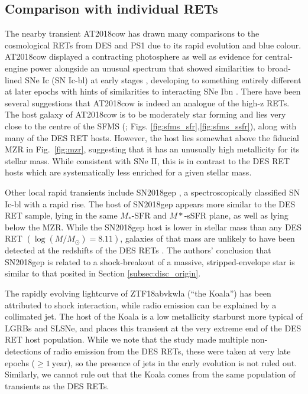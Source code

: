 \documentclass[fleqn,usenatbib,]{mnras}
\begin{document}
\subsection{Comparison with individual RETs \label{subsec:disc_lowz}}

The nearby transient AT2018cow has drawn many comparisons to the cosmological RETs from DES and PS1 \citep[e.g.][]{Perley2019,Margutti2019,Fox2019,Mohan2020} due to its rapid evolution and blue colour. AT2018cow displayed a contracting photosphere as well as evidence for central-engine power alongside an unusual spectrum that showed similarities to broad-lined SNe Ic (SN Ic-bl) at early stages \citep[e.g.][]{Xu2018,Izzo2018}, developing to something entirely different at later epochs \citep{Perley2019} with hints of similarities to interacting SNe Ibn \citep{Fox2019}. There have been several suggestions that AT2018cow is indeed an analogue of the high-z RETs. The host galaxy of AT2018cow is to be moderately star forming and lies very close to the centre of the SFMS (\citealt{Lyman2020}; Figs. \ref{fig:sfms_sfr},\ref{fig:sfms_ssfr}), along with many of the DES RET hosts. However, the host lies somewhat above the fiducial MZR in Fig.~\ref{fig:mzr}, suggesting that it has an unusually high metallicity for its stellar mass. While consistent with SNe II, this is in contrast to the DES RET hosts which are systematically less enriched for a given stellar mass. 

Other local rapid transients include SN2018gep \citep{Ho2019}, a spectroscopically classified SN Ic-bl with a rapid rise. The host of SN2018gep appears more similar to the DES RET sample, lying in the same $M_*$-SFR and $M*$-sSFR plane, as well as lying below the MZR. While the SN2018gep host is lower in stellar mass than any DES RET $\left(\log \left(M/M_{\odot}\right) =8.11\right)$, galaxies of that mass are unlikely to have been detected at the redshifts of the DES RETs \citep{Wiseman2020}. The authors' conclusion that SN2018gep is related to a shock-breakout of a massive, stripped-envelope star is similar to that posited in Section \ref{subsec:disc_origin}. 

The rapidly evolving lightcurve of ZTF18abvkwla (``the Koala'') has been attributed to shock interaction, while radio emission can be explained by a collimated jet. The host of the Koala is a low metallicity starburst more typical of LGRBs and SLSNe, and places this transient at the very extreme end of the DES RET host population. While we note that the \citet{Ho2020} study made multiple non-detections of radio emission from the DES RETs, these were taken at very late epochs ($\geq 1~\mathrm{year}$), so the presence of jets in the early evolution is not ruled out. Similarly, we cannot rule out that the Koala comes from the same population of transients as the DES RETs.
\end{document}
